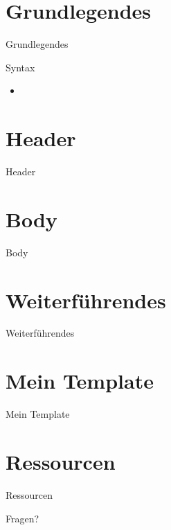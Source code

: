 \documentclass{beamer}
\begin{document}
\section{Grundlegendes}
\begin{frame}
\centering
\huge{Grundlegendes}
\end{frame}


\begin{frame}{Syntax}
\begin{itemize}
\item 
\end{itemize}
\end{frame}

\section{Header}

\begin{frame}
\centering
\huge{Header}
\end{frame}

\section{Body}
\begin{frame}
\centering
\huge{Body}
\end{frame}

\section{Weiterführendes}
\begin{frame}
\centering
\huge{Weiterführendes}
\end{frame}

\section{Mein Template}
\begin{frame}
\centering
\huge{Mein Template}
\end{frame}

\section{Ressourcen}
\begin{frame}
\centering
\huge{Ressourcen}
\end{frame}

\begin{frame}
\begin{center}
\huge{Fragen?}
\end{center}
\end{frame}
\end{document}
